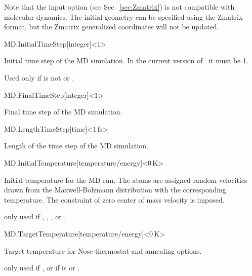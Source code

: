 Note that the  input option (see Sec.~\ref{sec:Zmatrix}) is not
compatible with molecular dynamics. The initial geometry can be
specified using the Zmatrix format, but the Zmatrix generalized
coordinates will not be updated.


\begin{fdfentry}{MD.InitialTimeStep}[integer]<$1$>
  
  Initial time step of the MD simulation.  In the current version of
  \siesta\ it must be 1.

  Used only if  is not  or .

\end{fdfentry}

\begin{fdfentry}{MD.FinalTimeStep}[integer]<$1$>

  Final time step of the MD simulation.

\end{fdfentry}


\begin{fdfentry}{MD.LengthTimeStep}[time]<$1\,\mathrm{fs}$>

  Length of the time step of the MD simulation.

\end{fdfentry}

\begin{fdfentry}{MD.InitialTemperature}[temperature/energy]<$0\,\mathrm K$>
  
  Initial temperature for the MD run. The atoms are assigned random
  velocities drawn from the Maxwell-Bolzmann distribution with the
  corresponding temperature. The constraint of zero center of mass
  velocity is imposed.

  \note only used if  , ,
  ,  or
  . 

\end{fdfentry}

\begin{fdfentry}{MD.TargetTemperature}[temperature/energy]<$0\,\mathrm K$>

  Target temperature for Nose thermostat and annealing options.

  \note only used if  ,
   or
   if  is  or
  .

\end{fdfentry}

